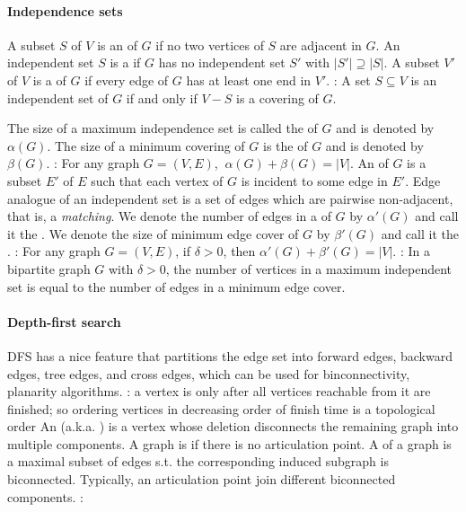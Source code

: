 \documentclass{myproc}
\def\sbf{\bfseries}
\begin{document}
\paragraph{Independence sets}
\bit
\w A subset $S$ of $V$ is an  of $G$ if no two
vertices of $S$ are adjacent in $G$. 
\w An independent set $S$ is a  if
	$G$ has no independent set $S'$ with $|S'| \supseteq |S|$.
\w A subset $V'$ of $V$ is a  of $G$ if every edge
of $G$ has at least one end in $V'$.
\w {}
: 
A set $S \subseteq V$ is an independent set of $G$ if and only if $V -
S$ is a covering of $G$.

\w The size of a maximum independence set is called the
 of $G$ and is denoted by $\alpha(G)$.
\w The size of a minimum covering of $G$ is the  of $G$ and is denoted by $\beta(G)$.
\w {\sbf Theorem}: For any graph $G = (V, E)$, $\ \alpha(G) + \beta(G) =
|V|$. 
\w An  of $G$ is a subset $E'$ of $E$ such that
each vertex of $G$ is incident to some edge in $E'$.
\w Edge analogue of an independent set is a set of edges which are
pairwise non-adjacent, that is, a {\em matching\/}.
\w {}
\w We denote the number of edges in a  of $G$ by
$\alpha'(G)$ and call it the .
\w We denote the size of minimum edge cover of $G$ by $\beta'(G)$ and
call it the .
\w {\sbf Theorem}: For any graph $G = (V, E)$, if $\delta > 0$, 
  then $\alpha'(G) + \beta'(G) = |V|$.
\w {\sbf Theorem}: In a bipartite graph $G$ with $\delta > 0$, the number of
vertices in a maximum independent set is equal to the number of edges
in a minimum edge cover.
\eit



\paragraph{Depth-first search}
\bit
\w DFS has a nice feature that partitions the edge set into forward edges,
backward edges, tree edges, and cross edges, which can be used for
binconnectivity, planarity algorithms.
\w {}: a vertex is  only after all vertices
reachable from it are finished; so ordering vertices in decreasing order of
finish time is a topological order
\w An  (a.k.a. ) is a vertex whose
deletion disconnects the remaining graph into multiple components.
\w A graph is  if there is no articulation point.
\w A  of a graph is a maximal subset of edges
s.t. the corresponding induced subgraph is biconnected. Typically,
an articulation point join different biconnected components.
\w {}: 
\end{document}
